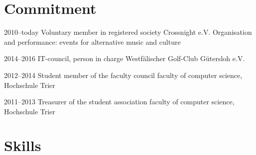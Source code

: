 \documentclass[]{friggeri-cv} %
\begin{document}

\section{Commitment}

\begin{entrylist}
	
	
	\entry
	{2010--today}
	{Voluntary member in registered society Crossnight e.V.}
	{}
	{Organisation and performance: events for alternative music and culture}
	
	\entry
	{2014--2016}
	{IT-council, person in charge}
	{}
	{Westf\"{a}lischer Golf-Club G\"{u}tersloh e.V.}
	
	
	
	\entry
	{2012--2014}
	{Student member of the faculty council}
	{}
	{faculty of computer science, Hochschule Trier}
	
	
	\entry
	{2011--2013}
	{Treasurer of the student association}
	{}
	{faculty of computer science, Hochschule Trier}
	
	
	
\end{entrylist}


\section{Skills}
\end{document}
